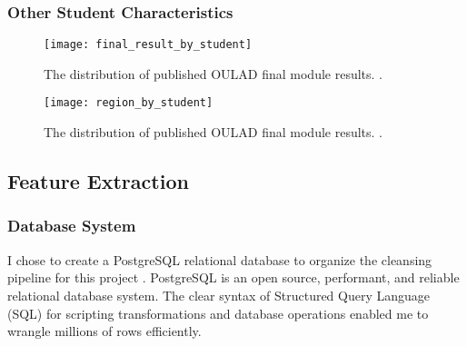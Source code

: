 \documentclass{article}
\begin{document}
            
            \subsubsection{Other Student Characteristics}
            
            \begin{figure}
                \centering
                \texttt{[image: final\_result\_by\_student]}
                \caption{The distribution of published OULAD final module results. \cite{oulad}.}
                \label{fig:final_result_by_student}
            \end{figure}
            \begin{figure}
                \centering
                \texttt{[image: region\_by\_student]}
                \caption{The distribution of published OULAD final module results. \cite{oulad}.}
                \label{fig:region_by_student}
            \end{figure}
        
        \subsection{Feature Extraction}
        
            \subsubsection{Database System}
                I chose to create a PostgreSQL relational database to organize the cleansing pipeline for this project \cite{postrgesql}.
                PostgreSQL is an open source, performant, and reliable relational database system. 
                The clear syntax of Structured Query Language (SQL) for scripting transformations 
                and database operations enabled me to wrangle millions of rows efficiently.
      
\end{document}
